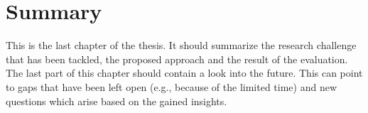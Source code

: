 \chapter{Summary}
\label{ch:summary}

This is the last chapter of the thesis. It should summarize the research challenge that has been tackled, the proposed approach and the result of the evaluation. The last part of this chapter should contain a look into the future. This can point to gaps that have been left open (e.g., because of the limited time) and new questions which arise based on the gained insights.